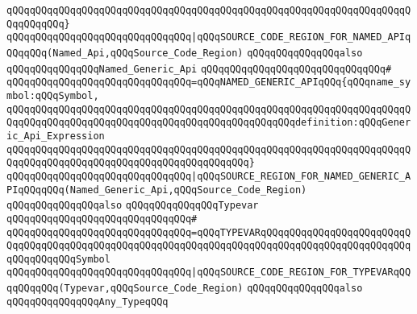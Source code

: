 \verb|qQQqqQQqqQQqqQQqqQQqqQQqqQQqqQQqqQQqqQQqqQQqqQQqqQQqqQQqqQQqqQQqqQQqqQQqqQQqqQQq}|\newline
\newline
\verb|qQQqqQQqqQQqqQQqqQQqqQQqqQQqqQQq|\verb#|qQQqSOURCE_CODE_REGION_FOR_NAMED_APIqQQqqQQq(Named_Api,qQQqSource_Code_Region)#\newline
\newline
\newline
\newline
\verb|qQQqqQQqqQQqqQQqalso|\newline
\verb|qQQqqQQqqQQqqQQqNamed_Generic_Api|\newline
\verb|qQQqqQQqqQQqqQQqqQQqqQQqqQQqqQQq#|\newline
\verb|qQQqqQQqqQQqqQQqqQQqqQQqqQQqqQQq=qQQqNAMED_GENERIC_APIqQQq{qQQqname_symbol:qQQqSymbol,|\newline
\verb|qQQqqQQqqQQqqQQqqQQqqQQqqQQqqQQqqQQqqQQqqQQqqQQqqQQqqQQqqQQqqQQqqQQqqQQqqQQqqQQqqQQqqQQqqQQqqQQqqQQqqQQqqQQqqQQqqQQqqQQqdefinition:qQQqGeneric_Api_Expression|\newline
\verb|qQQqqQQqqQQqqQQqqQQqqQQqqQQqqQQqqQQqqQQqqQQqqQQqqQQqqQQqqQQqqQQqqQQqqQQqqQQqqQQqqQQqqQQqqQQqqQQqqQQqqQQqqQQqqQQq}|\newline
\newline
\verb|qQQqqQQqqQQqqQQqqQQqqQQqqQQqqQQq|\verb#|qQQqSOURCE_REGION_FOR_NAMED_GENERIC_APIqQQqqQQq(Named_Generic_Api,qQQqSource_Code_Region)#\newline
\newline
\newline
\newline
\verb|qQQqqQQqqQQqqQQqalso|\newline
\verb|qQQqqQQqqQQqqQQqTypevar|\newline
\verb|qQQqqQQqqQQqqQQqqQQqqQQqqQQqqQQq#|\newline
\verb|qQQqqQQqqQQqqQQqqQQqqQQqqQQqqQQq=qQQqTYPEVARqQQqqQQqqQQqqQQqqQQqqQQqqQQqqQQqqQQqqQQqqQQqqQQqqQQqqQQqqQQqqQQqqQQqqQQqqQQqqQQqqQQqqQQqqQQqqQQqqQQqqQQqqQQqSymbol|\newline
\verb|qQQqqQQqqQQqqQQqqQQqqQQqqQQqqQQq|\verb#|qQQqSOURCE_CODE_REGION_FOR_TYPEVARqQQqqQQqqQQq(Typevar,qQQqSource_Code_Region)#\newline
\newline
\newline
\newline
\verb|qQQqqQQqqQQqqQQqalso|\newline
\verb|qQQqqQQqqQQqqQQqAny_TypeqQQq|\newline
